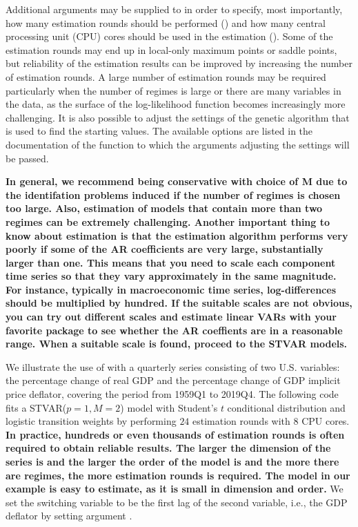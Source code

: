 \documentclass[nojss]{jss}
\begin{document}
Additional arguments may be supplied to  in order to specify, most importantly, how many estimation rounds should be performed () and how many central processing unit (CPU) cores should be used in the estimation (). Some of the estimation rounds may end up in local-only maximum points or saddle points, but reliability of the estimation results can be improved by increasing the number of estimation rounds. A large number of estimation rounds may be required particularly when the number of regimes is large or there are many variables in the data, as the surface of the log-likelihood function becomes increasingly more challenging. It is also possible to adjust the settings of the genetic algorithm that is used to find the starting values. The available options are listed in the documentation of the function  to which the arguments adjusting the settings will be passed.

\textbf{In general, we recommend being conservative with choice of M due to the identifation problems induced if the number of regimes is chosen too large. Also, estimation of models that contain more than two regimes can be extremely challenging. Another important thing to know about estimation is that the estimation algorithm performs very poorly if some of the AR coefficients are very large, substantially larger than one. This means that you need to scale each component time series so that they vary approximately in the same magnitude. For instance, typically in macroeconomic time series, log-differences should be multiplied by hundred. If the suitable scales are not obvious, you can try out different scales and estimate linear VARs with your favorite package to see whether the AR coeffients are in a reasonable range. When a suitable scale is found, proceed to the STVAR models.}

We illustrate the use of  with a quarterly series consisting of two U.S. variables: the percentage change of real GDP and the percentage change of GDP implicit price deflator, covering the period from 1959Q1 to 2019Q4. The following code fits a STVAR($p=1,M=2$) model with Student's $t$ conditional distribution and logistic transition weights by performing $24$ estimation rounds with $8$ CPU cores. \textbf{In practice, hundreds or even thousands of estimation rounds is often required to obtain reliable results. The larger the dimension of the series is and the larger the order of the model is and the more there are regimes, the more estimation rounds is required. The model in our example is easy to estimate, as it is small in dimension and order.} We set the switching variable to be the first lag of the second variable, i.e., the GDP deflator by setting argument .
\end{document}

